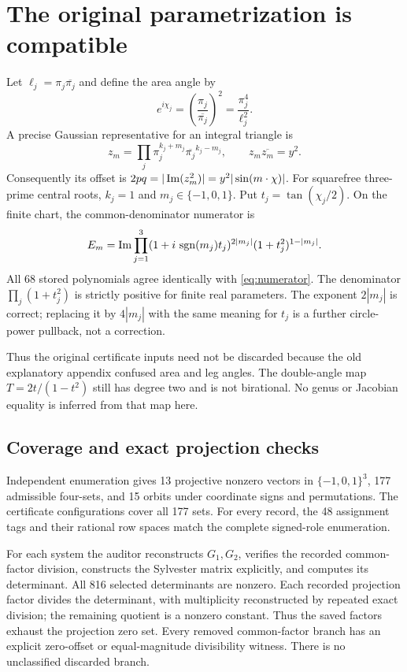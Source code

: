 \documentclass[11pt]{article}
\theoremstyle{remark}\newtheorem{remark}[theorem]{Remark}
\begin{document}
\section{The original parametrization is compatible}
Let $\ell_j=\pi_j\overline{\pi_j}$ and define the area angle by
\[
e^{i\chi_j}=\left(\frac{\pi_j}{\overline{\pi_j}}\right)^2
=\frac{\pi_j^4}{\ell_j^2}.
\]
A precise Gaussian representative for an integral triangle is
\[
z_m=\prod_j\pi_j^{k_j+m_j}\overline{\pi_j}^{k_j-m_j},
\qquad z_m\overline{z_m}=y^2.
\]
Consequently its offset is $2pq=|\operatorname{Im}(z_m^2)|=y^2|\sin(m\cdot\chi)|$. For squarefree three-prime central roots, $k_j=1$ and $m_j\in\{-1,0,1\}$. Put $t_j=\tan(\chi_j/2)$. On the finite chart, the common-denominator numerator is
\begin{equation}\label{eq:numerator}
E_m=\operatorname{Im}\prod_{j=1}^3
 (1+i\,\operatorname{sgn}(m_j)t_j)^{2|m_j|}
 (1+t_j^2)^{1-|m_j|}.
\end{equation}
All 68 stored polynomials agree identically with \eqref{eq:numerator}. The denominator $\prod_j(1+t_j^2)$ is strictly positive for finite real parameters. The exponent $2|m_j|$ is correct; replacing it by $4|m_j|$ with the same meaning for $t_j$ is a further circle-power pullback, not a correction.

Thus the original certificate inputs need not be discarded because the old explanatory appendix confused area and leg angles. The double-angle map $T=2t/(1-t^2)$ still has degree two and is not birational. No genus or Jacobian equality is inferred from that map here.

\subsection{Coverage and exact projection checks}
Independent enumeration gives 13 projective nonzero vectors in $\{-1,0,1\}^3$, 177 admissible four-sets, and 15 orbits under coordinate signs and permutations. The certificate configurations cover all 177 sets. For every record, the 48 assignment tags and their rational row spaces match the complete signed-role enumeration.

For each system the auditor reconstructs $G_1,G_2$, verifies the recorded common-factor division, constructs the Sylvester matrix explicitly, and computes its determinant. All 816 selected determinants are nonzero. Each recorded projection factor divides the determinant, with multiplicity reconstructed by repeated exact division; the remaining quotient is a nonzero constant. Thus the saved factors exhaust the projection zero set. Every removed common-factor branch has an explicit zero-offset or equal-magnitude divisibility witness. There is no unclassified discarded branch.
\end{document}
